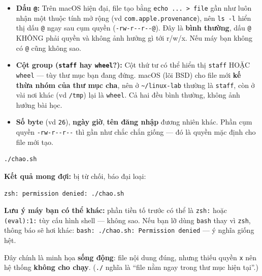 \documentclass[12pt,a4paper]{article}
\newcommand{\cmd}[1]{\texttt{#1}}
\begin{document}
\begin{notebox}
\begin{itemize}
\item \textbf{Dấu \cmd{@}:} Trên macOS hiện đại, file tạo bằng \cmd{echo ... > file}
  gần như luôn nhận một thuộc tính mở rộng (vd \cmd{com.apple.provenance}), nên
  \cmd{ls -l} hiển thị dấu \cmd{@} ngay sau cụm quyền (\cmd{-rw-r-{}-r-{}-@}). Đây
  là \textbf{bình thường}, dấu \cmd{@} KHÔNG phải quyền và không ảnh hưởng gì tới
  r/w/x. Nếu máy bạn không có \cmd{@} cũng không sao.
\item \textbf{Cột group (\cmd{staff} hay \cmd{wheel}?):} Cột thứ tư có thể hiển thị
  \cmd{staff} HOẶC \cmd{wheel} --- tùy thư mục bạn đang đứng. macOS (lõi BSD) cho
  file mới \textbf{kế thừa nhóm của thư mục cha}, nên ở \cmd{\textasciitilde/linux-lab}
  thường là \cmd{staff}, còn ở vài nơi khác (vd \cmd{/tmp}) lại là \cmd{wheel}. Cả
  hai đều bình thường, không ảnh hưởng bài học.
\item \textbf{Số byte} (vd \cmd{26}), \textbf{ngày giờ}, \textbf{tên đăng nhập}
  đương nhiên khác. Phần cụm quyền \cmd{-rw-r-{}-r-{}-} thì gần như chắc chắn giống
  --- đó là quyền mặc định cho file mới tạo.
\end{itemize}
\end{notebox}

\begin{labbox}
\begin{Verbatim}
./chao.sh
\end{Verbatim}
\textbf{Kết quả mong đợi:} bị từ chối, báo đại loại:
\begin{Verbatim}
zsh: permission denied: ./chao.sh
\end{Verbatim}
\textbf{Lưu ý máy bạn có thể khác:} phần tiền tố trước có thể là \cmd{zsh:} hoặc
\cmd{(eval):1:} tùy cấu hình shell --- không sao. Nếu bạn lỡ dùng \cmd{bash} thay vì
\cmd{zsh}, thông báo sẽ hơi khác: \cmd{bash: ./chao.sh: Permission denied} --- ý
nghĩa giống hệt.

Đây chính là minh họa \textbf{sống động}: file nội dung đúng, nhưng thiếu quyền
\cmd{x} nên hệ thống \textbf{không cho chạy}. (\cmd{./} nghĩa là ``file nằm ngay
trong thư mục hiện tại''.)
\end{labbox}
\end{document}
